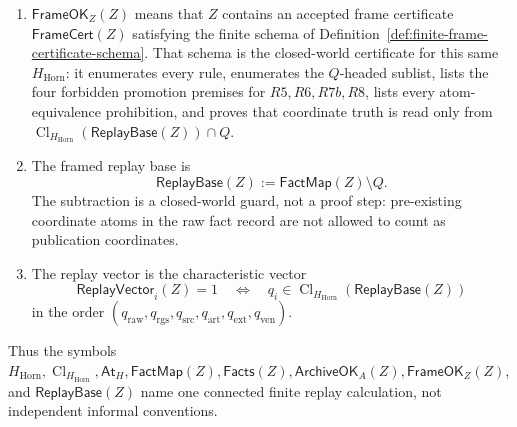 \documentclass[runningheads]{llncs}
\newcommand{\ArchiveOKA}{\mathsf{ArchiveOK}_{A}}
\newcommand{\Facts}{\mathsf{Facts}}
\newcommand{\FactMap}{\mathsf{FactMap}}
\newcommand{\AtH}{\mathsf{At}_{H}}
\newcommand{\ReplayVector}{\mathsf{ReplayVector}}
\newcommand{\ReplayBase}{\mathsf{ReplayBase}}
\newcommand{\FrameOKZ}{\mathsf{FrameOK}_{Z}}
\newcommand{\FrameCert}{\mathsf{FrameCert}}
\newcommand{\rawBeginTokenCoord}{q_{\mathrm{raw}}}
\newcommand{\qlex}{\rawBeginTokenCoord}
\newcommand{\qrgs}{q_{\mathrm{rgs}}}
\newcommand{\qsrc}{q_{\mathrm{src}}}
\newcommand{\qart}{q_{\mathrm{art}}}
\newcommand{\qext}{q_{\mathrm{ext}}}
\newcommand{\qven}{q_{\mathrm{ven}}}
\newcommand{\HHorn}{H_{\mathrm{Horn}}}
\newcommand{\ClHHorn}{\operatorname{Cl}_{\HHorn}}
\begin{document}
\begin{definition}
\begin{enumerate}
identity, transcripts, and script-conformance evidence, while
\(\operatorname{ReplayCertOK}\) lists the accepted replay rows whose
\(\operatorname{Emit}\)-fields become Horn atoms in \(\FactMap(Z)\).
\item \(\FrameOKZ(Z)\) means that \(Z\) contains an accepted frame certificate
\(\FrameCert(Z)\) satisfying the finite schema of
Definition~\ref{def:finite-frame-certificate-schema}.  That schema is the
closed-world certificate for this same \(\HHorn\): it enumerates every rule,
enumerates the \(Q\)-headed sublist, lists the four forbidden promotion premises
for \(R5,R6,R7b,R8\), lists every atom-equivalence prohibition, and proves that
coordinate truth is read only from \(\ClHHorn(\ReplayBase(Z))\cap Q\).
\item The framed replay base is
\[
\ReplayBase(Z):=\FactMap(Z)\setminus Q .
\]
The subtraction is a closed-world guard, not a proof step: pre-existing
coordinate atoms in the raw fact record are not allowed to count as publication
coordinates.
\item The replay vector is the characteristic vector
\[
\ReplayVector_i(Z)=1
\quad\Longleftrightarrow\quad
q_i\in\ClHHorn(\ReplayBase(Z))
\]
in the order \((\qlex,\qrgs,\qsrc,\qart,\qext,\qven)\).
\end{enumerate}
Thus the symbols
\(\HHorn,\operatorname{Cl}_{\HHorn},\AtH,\FactMap(Z),\Facts(Z),\ArchiveOKA(Z),
\FrameOKZ(Z)\), and \(\ReplayBase(Z)\) name one connected finite replay
calculation, not independent informal conventions.
\end{definition}
\end{document}
